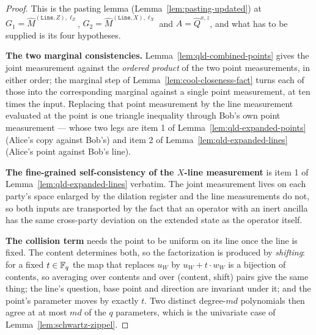 \begin{proof}
\leanok
{}
This is the pasting lemma (Lemma~\ref{lem:pasting-updated}) at
$G_1 = \widehat{M}^{(\mathtt{Line}, Z), \ell_Z}$, $G_2 = \widehat{M}^{(\mathtt{Line}, X),
\ell_X}$ and $A = \widehat{Q}^{x,z}$, and what has to be supplied is its four hypotheses.

\textbf{The two marginal consistencies.} Lemma~\ref{lem:qld-combined-points} gives the joint
measurement against the \emph{ordered product} of the two point measurements, in either order; the
marginal step of Lemma~\ref{lem:cool-closeness-fact} turns each of those into the corresponding
marginal against a single point measurement, at ten times the input. Replacing that point
measurement by the line measurement evaluated at the point is one triangle inequality through
Bob's own point measurement --- whose two legs are item 1 of Lemma~\ref{lem:qld-expanded-points}
(Alice's copy against Bob's) and item 2 of Lemma~\ref{lem:qld-expanded-lines} (Alice's point
against Bob's line).

\textbf{The fine-grained self-consistency of the $X$-line measurement} is item 1 of
Lemma~\ref{lem:qld-expanded-lines} verbatim. The joint measurement lives on each party's space
enlarged by the dilation register and the line measurements do not, so both inputs are
transported by the fact that an operator with an inert ancilla has the same cross-party deviation
on the extended state as the operator itself.

\textbf{The collision term} needs the point to be uniform on its line once the line is fixed. The
content determines both, so the factorization is produced by \emph{shifting}: for a fixed
$t \in \mathbb{F}_q$ the map that replaces $u_W$ by $u_W + t \cdot w_W$ is a bijection of contents, so
averaging over contents and over (content, shift) pairs give the same thing; the line's question,
base point and direction are invariant under it; and the point's parameter moves by exactly $t$.
Two distinct degree-$md$ polynomials then agree at at most $md$ of the $q$ parameters, which is the
univariate case of Lemma~\ref{lem:schwartz-zippel}.
\end{proof}

